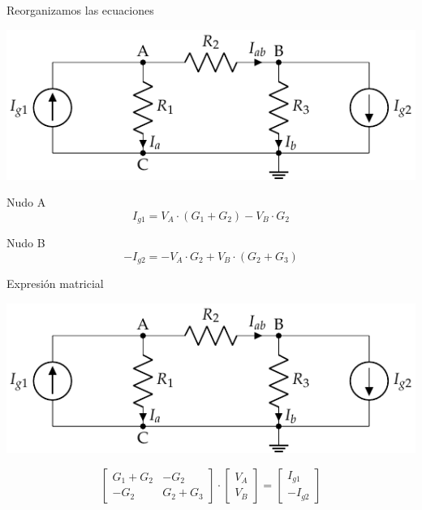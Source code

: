 \documentclass[aspectratio=169, usenames,svgnames,dvipsnames]{beamer}
\begin{document}
\begin{frame}[label={sec:org67d7837}]{Reorganizamos las ecuaciones}
\begin{center}
\includegraphics[width=.9\linewidth]{../figs/nudos.pdf}
\end{center}

Nudo A
\begin{equation*}
  I_{g1} = V_A \cdot (G_1 + G_2) - V_B \cdot G_2 
\end{equation*}

Nudo B
\begin{equation*}
  - I_{g2} = - V_A \cdot G_2 + V_B \cdot (G_2 + G_3)
\end{equation*}
\end{frame}
\begin{frame}[label={sec:org7c32df2}]{Expresión matricial}
\begin{center}
\includegraphics[width=.9\linewidth]{../figs/nudos.pdf}
\end{center}
\begin{equation*}
  \begin{bmatrix}
    G_1 + G_2 & - G_2\\
    -G_2 & G_2 + G_3
  \end{bmatrix} \cdot%
  \begin{bmatrix}
    V_A\\
    V_B
  \end{bmatrix} = %
  \begin{bmatrix}
    I_{g1}\\
    -I_{g2}
  \end{bmatrix}
\end{equation*}
\end{frame}
\end{document}
